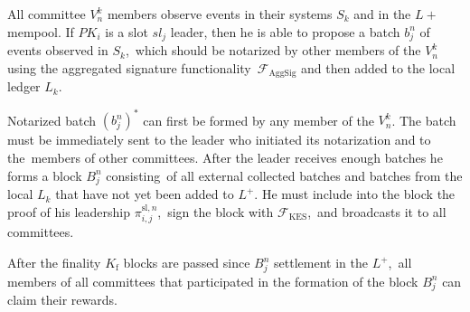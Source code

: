 \begin{legal}
    \item All committee $V^k_n$ members observe events in their systems $S_k$ and in the $L+$ mempool.
    If $PK_i$ is a slot $sl_j$ leader, then he is able to propose a batch $b^n_j$ of events observed in $S_k$,\
    which should be notarized by other members of the $V^k_n$ using the aggregated signature functionality\
    ${\mathcal{F}}_{\text{AggSig}}$ and then added to the local ledger $L_k$.

    \item Notarized batch $(b^n_j)^*$ can first be formed by any member of the $V^k_n$.
    The batch must be immediately sent to the leader who initiated its notarization and to the\
    members of other committees.
    After the leader receives enough batches he forms a block  $B^n_j$ consisting\
    of all external collected batches and batches from the local $L_k$ that have not yet been added to $L^+$.
    He must include into the block the proof of his leadership $ \pi_{i, j}^{\text{sl}, n}$,\
    sign the block with ${\mathcal{F}}_{\text{KES}}$,\
    and broadcasts it to all committees.

    \item After the finality $K_{\text{f}}$ blocks are passed since $B^n_j$ settlement in the $L^+$,\
    all members of all committees that participated in the formation of the block $B^n_j$ can claim their rewards.

\end{legal}

